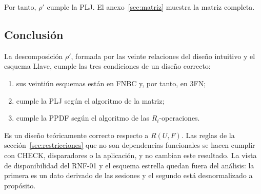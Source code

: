 

Por tanto, $\rho'$ cumple la PLJ. El anexo~\ref{sec:matriz} muestra la matriz completa.

\subsection{Conclusión}

La descomposición $\rho'$, formada por las veinte relaciones del diseño intuitivo y el esquema Llave, cumple las tres condiciones de un diseño correcto:
\begin{enumerate}
  \item sus veintiún esquemas están en FNBC y, por tanto, en 3FN;
  \item cumple la PLJ según el algoritmo de la matriz;
  \item cumple la PPDF según el algoritmo de las $R_i$-operaciones.
\end{enumerate}
Es un diseño teóricamente correcto respecto a $R(U, F)$. Las reglas de la sección~\ref{sec:restricciones} que no son dependencias funcionales se hacen cumplir con CHECK, disparadores o la aplicación, y no cambian este resultado. La vista de disponibilidad del RNF-01 y el esquema estrella quedan fuera del análisis: la primera es un dato derivado de las sesiones y el segundo está desnormalizado a propósito.
